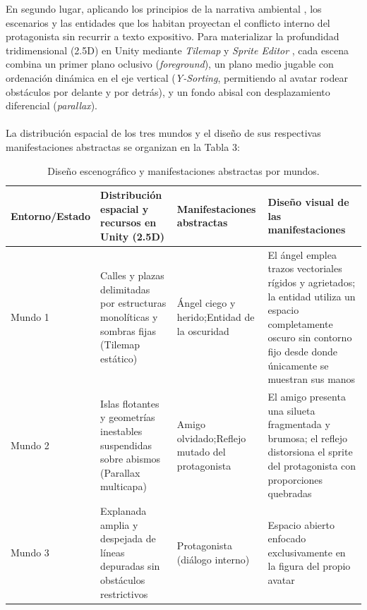 En segundo lugar, aplicando los principios de la narrativa ambiental \parencite{finestrat2018}, los escenarios y las entidades que los habitan proyectan el conflicto interno del protagonista sin recurrir a texto expositivo. Para materializar la profundidad tridimensional (2.5D) en Unity mediante \textit{Tilemap} y \textit{Sprite Editor} \parencite{unity2023}, cada escena combina un primer plano oclusivo (\textit{foreground}), un plano medio jugable con ordenación dinámica en el eje vertical (\textit{Y-Sorting}, permitiendo al avatar rodear obstáculos por delante y por detrás), y un fondo abisal con desplazamiento diferencial (\textit{parallax}).
\\\\
La distribución espacial de los tres mundos y el diseño de sus respectivas manifestaciones abstractas se organizan en la Tabla 3:
\begin{table}[H]
  \centering
  \caption{Diseño escenográfico y manifestaciones abstractas por mundos.}
  \label{tab:DiseñoEscenografico}
  \small
  \renewcommand{\arraystretch}{1.2}
  \begin{tabularx}{\textwidth}{>{\raggedright\arraybackslash}p{2.5cm}YYY}
    \toprule
    Entorno/Estado & Distribución espacial y recursos en Unity (2.5D) & Manifestaciones abstractas & Diseño visual de las manifestaciones \\
    \midrule
    Mundo 1 & Calles y plazas delimitadas por estructuras monolíticas y sombras fijas (Tilemap estático) & Ángel ciego y herido;Entidad de la oscuridad& El ángel emplea trazos vectoriales rígidos y agrietados; la entidad utiliza un espacio completamente oscuro sin contorno fijo desde donde únicamente se muestran sus manos\\
    Mundo 2 & Islas flotantes y geometrías inestables suspendidas sobre abismos (Parallax multicapa) & Amigo olvidado;Reflejo mutado del protagonista& El amigo presenta una silueta fragmentada y brumosa; el reflejo distorsiona el sprite del protagonista con proporciones quebradas\\
    Mundo 3 & Explanada amplia y despejada de líneas depuradas sin obstáculos restrictivos & Protagonista (diálogo interno) & Espacio abierto enfocado exclusivamente en la figura del propio avatar\\
    \bottomrule
  \end{tabularx}
\end{table}

